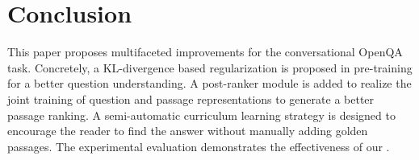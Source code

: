 \section{Conclusion}\label{sec:conclusion}
This paper proposes multifaceted improvements for the conversational OpenQA task. Concretely, a KL-divergence based regularization is proposed in pre-training for a better question understanding. A post-ranker module is added to realize the joint training of question and passage representations to generate a better passage ranking. A semi-automatic curriculum learning strategy is designed to encourage the reader to find the answer without manually adding golden passages.
The experimental evaluation demonstrates the effectiveness of our {\modelname}.
